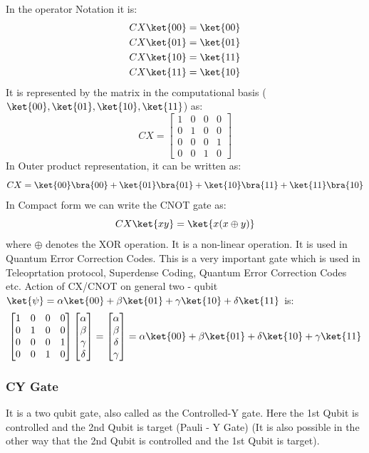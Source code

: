 \documentclass[12pt, oneside]{book}
\theoremstyle{definition}
\theoremstyle{definition}
\theoremstyle{remark}
\begin{document}
In the operator Notation it is:
\begin{align*}
    CX\ket{00}&=\ket{00} \\
    CX\ket{01}&=\ket{01} \\
    CX\ket{10}&=\ket{11} \\
    CX\ket{11}&=\ket{10}
\end{align*}
It is represented by the matrix in the computational basis ($\ket{00},\ket{01},\ket{10},\ket{11}$) as:
\[
    CX=\begin{bmatrix}
        1 & 0 & 0 & 0 \\
        0 & 1 & 0 & 0 \\
        0 & 0 & 0 & 1 \\
        0 & 0 & 1 & 0
    \end{bmatrix}
\]
In Outer product representation, it can be written as:
\[
    CX=\ket{00}\bra{00}+\ket{01}\bra{01}+\ket{10}\bra{11}+\ket{11}\bra{10}
\]
In Compact form we can write the CNOT gate as:
\[
    CX\ket{xy}=\ket{x(x\oplus y)}
\]
where $\oplus$ denotes the XOR operation. It is a non-linear operation. It is used in Quantum Error Correction Codes.
This is a very important gate which is used in Teleoprtation protocol, Superdense Coding, Quantum Error Correction Codes etc.
Action of CX/CNOT on general two - qubit $\ket{\psi} = \alpha\ket{00}+\beta\ket{01}+\gamma\ket{10}+\delta\ket{11}$ is:
\[
    \begin{bmatrix} 
        1 & 0 & 0 & 0 \\
        0 & 1 & 0 & 0 \\
        0 & 0 & 0 & 1 \\
        0 & 0 & 1 & 0
    \end{bmatrix}\begin{bmatrix}
        \alpha \\
        \beta \\
        \gamma \\
        \delta
    \end{bmatrix}=\begin{bmatrix}
        \alpha \\
        \beta \\
        \delta \\
        \gamma
    \end{bmatrix}=\alpha\ket{00}+\beta\ket{01}+\delta\ket{10}+\gamma\ket{11}
\]

\subsubsection{CY Gate}
It is a two qubit gate, also called as the Controlled-Y gate.
Here the 1st Qubit is controlled and the 2nd Qubit is target (Pauli - Y Gate)
(It is also possible in the other way that the 2nd Qubit is controlled and the 1st Qubit is target).
\end{document}
